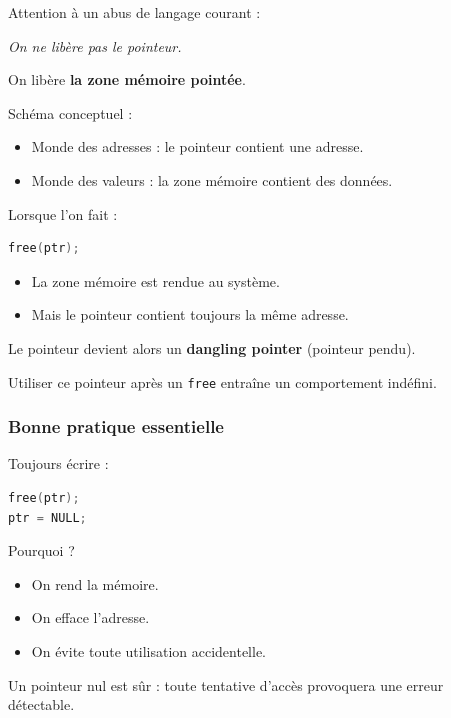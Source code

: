 Attention à un abus de langage courant :

\begin{center}
\textit{On ne libère pas le pointeur.}
\end{center}

On libère \textbf{la zone mémoire pointée}.

Schéma conceptuel :

\begin{itemize}
    \item Monde des adresses : le pointeur contient une adresse.
    \item Monde des valeurs : la zone mémoire contient des données.
\end{itemize}

Lorsque l’on fait :

\begin{lstlisting}[language=C]
free(ptr);
\end{lstlisting}

\begin{itemize}
    \item La zone mémoire est rendue au système.
    \item Mais le pointeur contient toujours la même adresse.
\end{itemize}

Le pointeur devient alors un \textbf{dangling pointer}
(pointeur pendu).

Utiliser ce pointeur après un \texttt{free}
entraîne un comportement indéfini.

\subsubsection{Bonne pratique essentielle}

Toujours écrire :

\begin{lstlisting}[language=C]
free(ptr);
ptr = NULL;
\end{lstlisting}

Pourquoi ?

\begin{itemize}
    \item On rend la mémoire.
    \item On efface l’adresse.
    \item On évite toute utilisation accidentelle.
\end{itemize}

Un pointeur nul est sûr : toute tentative d’accès
provoquera une erreur détectable.

